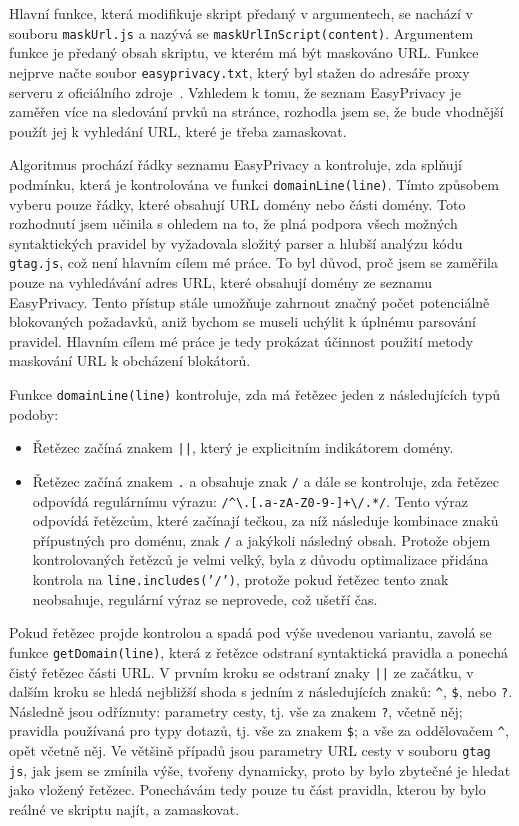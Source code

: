 Hlavní funkce, která modifikuje skript předaný v argumentech, se nachází v souboru \texttt{maskUrl.js} a nazývá se \texttt{maskUrlInScript(content)}. Argumentem funkce je předaný obsah skriptu, ve kterém má být maskováno URL. Funkce nejprve načte soubor \texttt{easyprivacy.txt}, který byl stažen do adresáře proxy serveru z oficiálního zdroje~\cite{easyPrivacy}. Vzhledem k tomu, že seznam EasyPrivacy je zaměřen více na sledování prvků na stránce, rozhodla jsem se, že bude vhodnější použít jej k vyhledání URL, které je třeba zamaskovat.

Algoritmus prochází řádky seznamu EasyPrivacy a kontroluje, zda splňují podmínku, která je kontrolována ve funkci \texttt{domainLine(line)}. Tímto způsobem vyberu pouze řádky, které obsahují URL domény nebo části domény. Toto rozhodnutí jsem učinila s ohledem na to, že plná podpora všech možných syntaktických pravidel by vyžadovala složitý parser a hlubší analýzu kódu \texttt{gtag.js}, což není hlavním cílem mé práce. To byl důvod, proč jsem se zaměřila pouze na vyhledávání adres URL, které obsahují domény ze seznamu EasyPrivacy. Tento přístup stále umožňuje zahrnout značný počet potenciálně blokovaných požadavků, aniž bychom se museli uchýlit k úplnému parsování pravidel. Hlavním cílem mé práce je tedy prokázat účinnost použití metody maskování URL k obcházení blokátorů.

Funkce \texttt{domainLine(line)} kontroluje, zda má řetězec jeden z následujících typů podoby:
\begin{itemize}
    \item Řetězec začíná znakem \texttt{||}, který je explicitním indikátorem domény.
    \item Řetězec začíná znakem \texttt{.} a obsahuje znak \texttt{/} a dále se kontroluje, zda řetězec odpovídá regulárnímu výrazu: \verb|/^\.[.a-zA-Z0-9-]+\/.*/|. Tento výraz odpovídá řetězcům, které začínají tečkou, za níž následuje kombinace znaků přípustných pro doménu, znak \texttt{/} a jakýkoli následný obsah. Protože objem kontrolovaných řetězců je velmi velký, byla z důvodu optimalizace přidána kontrola na \texttt{line.includes('/')},
 protože pokud řetězec tento znak neobsahuje, regulární výraz se neprovede, což ušetří čas. 
\end{itemize}

Pokud řetězec projde kontrolou a spadá pod výše uvedenou variantu, zavolá se funkce \texttt{getDomain(line)}, která z řetězce odstraní syntaktická pravidla a ponechá čistý řetězec části URL. V prvním kroku se odstraní znaky \texttt{||} ze začátku, v dalším kroku se hledá nejbližší shoda s jedním z následujících znaků: \verb|^|, \verb|$|,  nebo \verb|?|.  Následně jsou odříznuty: parametry cesty, tj. vše za znakem \texttt{?}, včetně něj; pravidla používaná pro typy dotazů, tj. vše za znakem \verb|$|; a vše za oddělovačem \verb|^|, opět včetně něj. Ve většině případů jsou parametry URL cesty v souboru \texttt{gtag js}, jak jsem se zmínila výše, tvořeny dynamicky, proto by bylo zbytečné je hledat jako vložený řetězec. Ponechávám tedy pouze tu část pravidla, kterou by bylo reálné ve skriptu najít, a zamaskovat.

